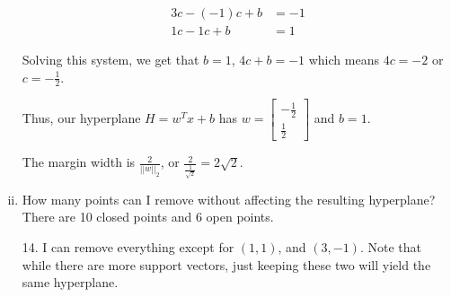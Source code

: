 \begin{Parts}
\begin{enumerate}[i.]
\begin{solution}
\begin{align*}
3c - (-1)c + b &= -1\\
1c - 1c + b &= 1
\end{align*}

Solving this system, we get that $b = 1$, $4c + b = -1$ which means $4c = -2$ or $c = -\frac{1}{2}$.

Thus, our hyperplane $H = w^Tx + b$ has $w = \begin{bmatrix} -\frac{1}{2}  \\ \frac{1}{2} \end{bmatrix}$ and $b = 1$.

The margin width is $\frac{2}{||w||_2}$, or $\frac{2}{\frac{1}{\sqrt{2}}} = 2\sqrt{2}$.

\end{solution}

\item How many points can I remove without affecting the resulting hyperplane? There are 10 closed points and 6 open points.

\begin{solution}

14. I can remove everything except for $(1,1)$, and $(3,-1)$. Note that while there are more support vectors, just keeping these two will yield the same hyperplane.

\end{solution}


\end{enumerate}

\end{Parts}

\newpage
